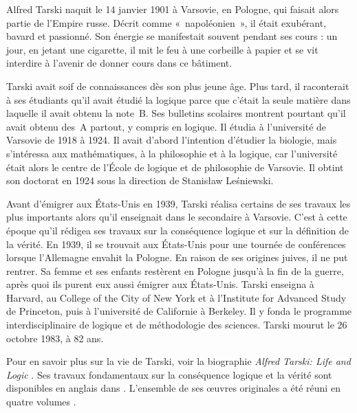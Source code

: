 \documentclass[../../../include/open-logic-section]{subfiles}
\begin{document}



Alfred Tarski naquit le 14 janvier 1901 à Varsovie, en Pologne, qui
faisait alors partie de l'Empire russe. Décrit comme «~napoléonien~»,
il était exubérant, bavard et passionné. Son énergie se manifestait
souvent pendant ses cours : un jour, en jetant une cigarette, il mit
le feu à une corbeille à papier et se vit interdire à l'avenir de
donner cours dans ce bâtiment.

Tarski avait soif de connaissances dès son plus jeune âge. Plus tard,
il raconterait à ses étudiants qu'il avait étudié la logique parce
que c'était la seule matière dans laquelle il avait obtenu la note~B.
Ses bulletins scolaires montrent pourtant qu'il avait obtenu des~A
partout, y compris en logique. Il étudia à l'université de Varsovie
de 1918 à 1924. Il avait d'abord l'intention d'étudier la biologie,
mais s'intéressa aux mathématiques, à la philosophie et à la logique,
car l'université était alors le centre de l'École de logique et de
philosophie de Varsovie. Il obtint son doctorat en 1924 sous la
direction de Stanis\l{}aw Le\'{s}niewski.

Avant d'émigrer aux États-Unis en 1939, Tarski réalisa certains de
ses travaux les plus importants alors qu'il enseignait dans le
secondaire à Varsovie. C'est à cette époque qu'il rédigea ses travaux
sur la conséquence logique et sur la définition de la vérité. En 1939, il se
trouvait aux États-Unis pour une tournée de conférences lorsque
l'Allemagne envahit la Pologne. En raison de ses origines juives, il
ne put rentrer. Sa femme et ses enfants restèrent en Pologne jusqu'à
la fin de la guerre, après quoi ils purent eux aussi émigrer aux
États-Unis. Tarski enseigna à Harvard, au College of the City of New
York et à l'Institute for Advanced Study de Princeton, puis à
l'université de Californie à Berkeley. Il y fonda le programme
interdisciplinaire de logique et de méthodologie des sciences.
Tarski mourut le 26 octobre 1983, à 82 ans.

\begin{reading}
Pour en savoir plus sur la vie de Tarski, voir la biographie
\emph{Alfred Tarski: Life and Logic} \citep{Feferman2004}.
Ses travaux fondamentaux sur la conséquence logique et la vérité
sont disponibles en anglais dans \citep{Tarski1983}. L'ensemble
de ses œuvres originales a été réuni en quatre volumes
\citep{Tarski1981}.
\end{reading}
\end{document}
